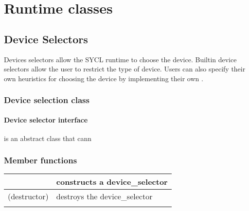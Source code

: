 \documentclass[letterpaper,10pt,english]{sphinxmanual}
\begin{document}
\section{Runtime classes}
\label{\detokenize{programming-interface/index:runtime-classes}}

\subsection{Device Selectors}
\label{\detokenize{programming-interface/runtime/device-selectors:device-selectors}}\label{\detokenize{programming-interface/runtime/device-selectors::doc}}
Devices selectors allow the SYCL runtime to choose the
device. Built\sphinxhyphen{}in device selectors allow the user to restrict the type
of device. Users can also specify their own heuristics for choosing
the device by implementing their own .


\subsubsection{Device selection class}
\label{\detokenize{programming-interface/runtime/device-selector:device-selection-class}}\label{\detokenize{programming-interface/runtime/device-selector::doc}}

\paragraph{Device selector interface}
\label{\detokenize{programming-interface/runtime/device-selector:device-selector-interface}}
\begin{sphinxVerbatim}[commandchars=\\\{\}]
 
\end{sphinxVerbatim}

 is an abstract class that cann
\subsubsection*{Member functions}


\begin{savenotes}\sphinxattablestart
\centering
\begin{tabulary}{\linewidth}[t]{|T|T|}
\hline

{\hyperref[\detokenize{programming-interface/runtime/device-selector:constructor}]{}}
&
constructs a device\_selector
\\
\hline
(destructor)
&
destroys the device\_selector
\\
\hline
{\hyperref[\detokenize{programming-interface/runtime/device-selector:select-device}]{}}
&\\
\hline
\end{tabulary}
\par
\sphinxattableend\end{savenotes}
\end{document}
